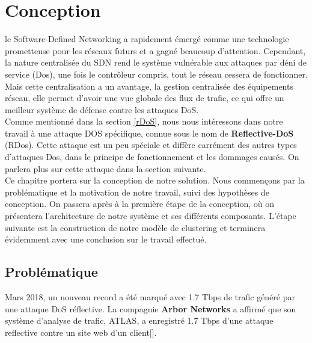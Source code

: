 \chapter{Conception}

\label{Chapter4} 
le Software-Defined Networking a rapidement émergé comme une technologie prometteuse pour les réseaux futurs et a gagné beaucoup d'attention. Cependant, la nature centralisée du SDN rend le système vulnérable aux attaques par déni de service (Dos), une fois le contrôleur compris, tout le réseau cessera de fonctionner. Mais cette centralisation a un avantage, la gestion centralisée des équipements réseau, elle permet d'avoir une vue globale des flux de trafic, ce qui offre un meilleur système de défense contre les attaques DoS.\\

Comme mentionné dans la section \ref{rDoS}, nous nous intéressons dans notre travail à une attaque DOS spécifique, connue sous le nom de \textbf{Reflective-DoS} (RDos). Cette attaque est un peu spéciale et diffère carrément des autres types d'attaques Dos, dans le principe de fonctionnement et les dommages causés. On parlera plus sur cette attaque dans la section suivante. \\

Ce chapitre portera sur la conception de notre solution. Nous commençons par la problématique et la motivation de notre travail, suivi des hypothèses de conception. On passera après à la première étape de la conception, où on présentera l'architecture de notre système et ses différents composants. L'étape suivante est la construction de notre modèle de clustering  et terminera évidemment avec une conclusion sur le travail effectué.

\section{Problématique}
Mars 2018, un nouveau record a été marqué avec 1.7 Tbps de trafic généré par une attaque DoS réflective. La compagnie \textbf{Arbor Networks} a affirmé que son système d'analyse de trafic, ATLAS, a enregistré 1.7 Tbps d'une attaque reflective contre un site web d'un client[\cite{22}].\\

